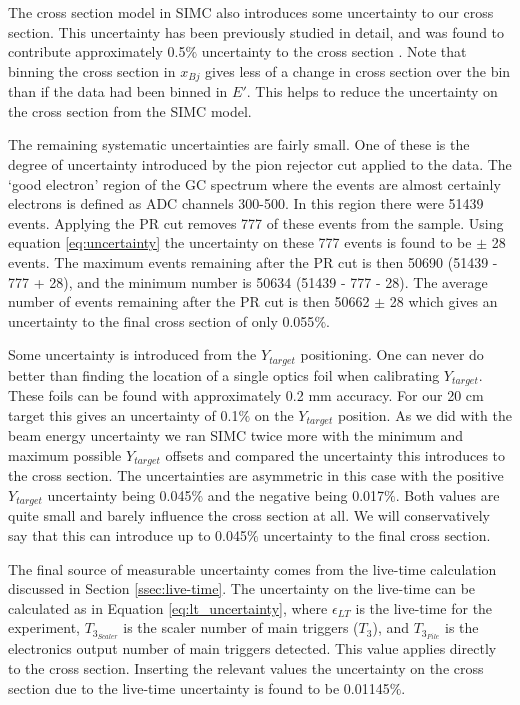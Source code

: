 The cross section model in SIMC also introduces some uncertainty to our cross section. This uncertainty has been previously studied in detail, and was found to contribute approximately 0.5$\%$ uncertainty to the cross section \cite{Thesis:Nguyen}. Note that binning the cross section in $x_{Bj}$ gives less of a change in cross section over the bin than if the data had been binned in $E'$. This helps to reduce the uncertainty on the cross section from the SIMC model.

The remaining systematic uncertainties are fairly small. One of these is the degree of uncertainty introduced by the pion rejector cut applied to the data. The `good electron' region of the GC spectrum where the events are almost certainly electrons is defined as ADC channels 300-500. In this region there were 51439 events. Applying the PR cut removes 777 of these events from the sample. Using equation \ref{eq:uncertainty} the uncertainty on these 777 events is found to be $\pm$ 28 events. The maximum events remaining after the PR cut is then 50690 (51439 - 777 + 28), and the minimum number is 50634 (51439 - 777 - 28). The average number of events remaining after the PR cut is then 50662 $\pm$ 28 which gives an uncertainty to the final cross section of only 0.055$\%$.

Some uncertainty is introduced from the $Y_{target}$ positioning. One can never do better than finding the location of a single optics foil when calibrating $Y_{target}$. These foils can be found with approximately 0.2 mm accuracy. For our 20 cm target this gives an uncertainty of 0.1$\%$ on the $Y_{target}$ position. As we did with the beam energy uncertainty we ran SIMC twice more with the minimum and maximum possible $Y_{target}$ offsets and compared the uncertainty this introduces to the cross section. The uncertainties are asymmetric in this case with the positive $Y_{target}$ uncertainty being 0.045$\%$ and the negative being 0.017$\%$. Both values are quite small and barely influence the cross section at all. We will conservatively say that this can introduce up to 0.045$\%$ uncertainty to the final cross section. 

The final source of measurable uncertainty comes from the live-time calculation discussed in Section \ref{ssec:live-time}. The uncertainty on the live-time can be calculated as in Equation \ref{eq:lt_uncertainty}, where $\epsilon_{LT}$ is the live-time for the experiment, $T_{3_{Scaler}}$ is the scaler number of main triggers ($T_3$), and $T_{3_{File}}$ is the electronics output number of main triggers detected. This value applies directly to the cross section. Inserting the relevant values the uncertainty on the cross section due to the live-time uncertainty is found to be 0.01145$\%$.

